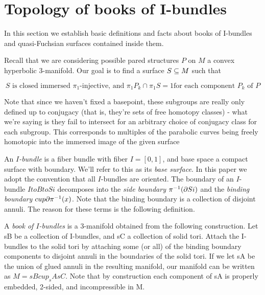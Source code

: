 \section{Topology of books of I-bundles}

In this section we establish basic definitions and facts about books of
I-bundles and quasi-Fuchsian surfaces contained inside them.

Recall that we are considering possible pared structures $P$ on $M$ a convex
hyperbolic 3-manifold. Our goal is to find a surface $S \subseteq M$ such that

\begin{equation}\label{E:qf}
S \text{ is closed immersed $\pi_1$-injective, and $\pi_1P_k \cap \pi_1S = 1$
for each component $P_k$ of $P$} \tag{QF}
\end{equation}

Note that since we haven't fixed a basepoint, these subgroups are really only
defined up to conjugacy (that is, they're sets of free homotopy classes) - what
we're saying is they fail to intersect for an arbitrary choice of conjugacy
class for each subgroup. This corresponds to multiples of the parabolic curves
being freely homotopic into the immersed image of the given surface

\begin{defn}

An \emph{$I$-bundle} is a fiber bundle with fiber $I=[0,1]$, and base space
a compact surface with boundary. We'll refer to this as its \emph{base
surface}.  In this paper we adopt the convention that all $I$-bundles are
oriented.  The boundary of an $I$-bundle $I to B to Si$ decomposes into the
\emph{side boundary} $\pi^{-1}(\partial Si)$ and the \emph{binding boundary} $cup
\partial \pi^{-1}(x)$. Note that the binding boundary is a collection of disjoint
annuli. The reason for these terms is the following definition.

A \emph{book of $I$-bundles} is a 3-manifold obtained from the following
construction. Let sB be a collection of I-bundles, and sC a collection of solid
tori. Attach the I-bundles to the solid tori by attaching some (or all) of the
binding boundary components to disjoint annuli in the boundaries of the solid
tori.  If we let sA be the union of glued annuli in the resulting manifold, our
manifold can be written as $M=sB cup_sA sC$. Note that by construction each
component of sA is properly embedded, 2-sided, and incompressible in M.

\end{defn}

